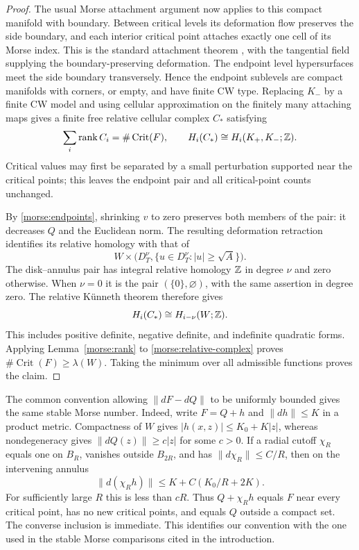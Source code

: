 \begin{proof}
The usual Morse attachment argument now applies to this compact
manifold with boundary.  Between critical levels its deformation
flow preserves the side boundary, and each interior critical point
attaches exactly one cell of its Morse index.  This is the standard
attachment theorem \cite[Section~3]{Milnor1963}, with the tangential
field supplying the boundary-preserving deformation.  The endpoint
level hypersurfaces meet the side boundary transversely.  Hence the
endpoint sublevels are compact manifolds with corners, or empty,
and have finite CW type.  Replacing $K_-$ by a finite CW model and
using cellular approximation on the finitely many attaching maps
gives a finite free relative cellular complex $C_*$ satisfying
\begin{equation}\label{morse:relative-complex}
 \sum_i\operatorname{rank} C_i=\#\operatorname{Crit}(F),\qquad
 H_i(C_*)\cong H_i(K_+,K_-;\mathbb Z).
\end{equation}
Critical values may first be separated by a small perturbation
supported near the critical points; this leaves the endpoint pair
and all critical-point counts unchanged.

By \eqref{morse:endpoints}, shrinking $v$ to zero preserves both
members of the pair: it decreases $Q$ and the Euclidean norm.
The resulting deformation retraction identifies its relative
homology with that of
\[
 W\times\bigl(D_T^{\nu},
       \{u\in D_T^{\nu}:|u|\geq\sqrt A\}\bigr).
\]
The disk--annulus pair has integral relative homology $\mathbb Z$ in
degree $\nu$ and zero otherwise.  When $\nu=0$ it is the pair
$(\{0\},\varnothing)$, with the same assertion in degree zero.
The relative K\"unneth theorem therefore gives
\[
 H_i(C_*)\cong H_{i-\nu}(W;\mathbb Z).
\]
This includes positive definite, negative definite, and indefinite
quadratic forms.  Applying Lemma~\ref{morse:rank} to
\eqref{morse:relative-complex} proves
$\#\operatorname{Crit}(F)\geq\lambda(W)$.
Taking the minimum over all admissible functions proves the claim.
\end{proof}

\begin{remark}\label{morse:conventions}
The common convention allowing $\|dF-dQ\|$ to be uniformly bounded
gives the same stable Morse number. Indeed, write $F=Q+h$ and
$\|dh\|\leq K$ in a product metric. Compactness of $W$ gives
$|h(x,z)|\leq K_0+K|z|$, whereas nondegeneracy gives
$\|dQ(z)\|\geq c|z|$ for some $c>0$. If a radial cutoff $\chi_R$
equals one on $B_R$, vanishes outside $B_{2R}$, and has
$\|d\chi_R\|\leq C/R$, then on the intervening annulus
\[
 \|d(\chi_Rh)\|\leq K+C(K_0/R+2K).
\]
For sufficiently large $R$ this is less than $cR$.
Thus $Q+\chi_Rh$ equals $F$ near every critical point, has no new
critical points, and equals $Q$ outside a compact set. The converse
inclusion is immediate. This identifies our convention with the
one used in the stable Morse comparisons cited in the introduction.
\end{remark}

